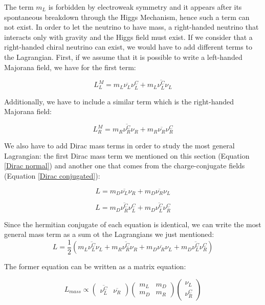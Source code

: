 The term $m_L$ is forbidden by electroweak symmetry and it appears after its spontaneous breakdown through the Higgs Mechanism, hence such a term can not exist. In order to let the neutrino to have mass, a right-handed neutrino that interacts only with gravity and the Higgs field must exist.
If we consider that a right-handed chiral neutrino can exist, we would have to add different terms to the Lagrangian. First, if 
we assume that it is possible to write a left-handed Majorana field, we have for the first term:

\begin{equation}
L_L^{M} = m_L \overline{\nu_L} \nu_{L}^C + m_L \overline{\nu_L^C} \nu_L
\end{equation}

Additionally, we have to include a similar term which is the right-handed Majorana field:

\begin{equation}
L_R^{M} = m_R \overline{\nu_R^C} \nu_{R} + m_R \overline{\nu_R} \nu_R^C
\end{equation}

We also have to add Dirac mass terms in order to study the most general Lagrangian: the first Dirac mass term we mentioned on this section (Equation \ref{Dirac normal}) and another one that comes from the 
charge-conjugate fields (Equation \ref{Dirac conjugated}):

\begin{equation}\label{Dirac normal}
L = m_D \overline{\nu_L}\nu_R + m_D \overline{\nu_R}\nu_L
\end{equation} 

\begin{equation}\label{Dirac conjugated}
L = m_D \overline{\nu_R^C} \nu_L^C + m_D \overline{\nu_L^C}\nu_R^C
\end{equation} 

Since the hermitian conjugate of each equation is identical, we can write the most general mass term as a sum ot the Lagrangians we just mentioned:
\begin{equation}
L = \frac{1}{2} \left( m_L \overline{\nu_L^C} \nu_L + m_R \overline{\nu_R^C} \nu_{R} + m_D \overline{\nu_R}\nu_L + m_D \overline{\nu_L^C}\nu_R^C   \right)
\end{equation}

The former equation can be written as a matrix equation: 

\begin{equation}\label{matrix_m_sa}
L_{mass} \propto
\begin{pmatrix} 
  \overline{\nu_L^C} & \overline{\nu_R}
\end{pmatrix}
\begin{pmatrix}
  m_L & m_D \\
  m_D & m_R  
\end{pmatrix}
\begin{pmatrix}
  \nu_L \\
  \nu_R^C  
\end{pmatrix}
\end{equation}

